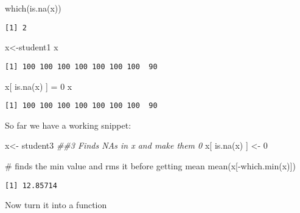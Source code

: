 \documentclass[
  letterpaper,
  DIV=11,
  numbers=noendperiod]{scrartcl}
\newenvironment{Shaded}{\begin{snugshade}}{\end{snugshade}}
\newcommand{\CommentTok}[1]{\textcolor[rgb]{0.37,0.37,0.37}{#1}}
\newcommand{\DecValTok}[1]{\textcolor[rgb]{0.68,0.00,0.00}{#1}}
\newcommand{\DocumentationTok}[1]{\textcolor[rgb]{0.37,0.37,0.37}{\textit{#1}}}
\newcommand{\FunctionTok}[1]{\textcolor[rgb]{0.28,0.35,0.67}{#1}}
\newcommand{\NormalTok}[1]{\textcolor[rgb]{0.00,0.23,0.31}{#1}}
\newcommand{\OtherTok}[1]{\textcolor[rgb]{0.00,0.23,0.31}{#1}}
\newcommand{\SpecialCharTok}[1]{\textcolor[rgb]{0.37,0.37,0.37}{#1}}
\begin{document}
\begin{Shaded}
\begin{Highlighting}[]
\FunctionTok{which}\NormalTok{(}\FunctionTok{is.na}\NormalTok{(x))}
\end{Highlighting}
\end{Shaded}

\begin{verbatim}
[1] 2
\end{verbatim}

\begin{Shaded}
\begin{Highlighting}[]
\NormalTok{x}\OtherTok{\textless{}{-}}\NormalTok{student1}
\NormalTok{x}
\end{Highlighting}
\end{Shaded}

\begin{verbatim}
[1] 100 100 100 100 100 100 100  90
\end{verbatim}

\begin{Shaded}
\begin{Highlighting}[]
\NormalTok{x[ }\FunctionTok{is.na}\NormalTok{(x) ] }\OtherTok{=} \DecValTok{0}
\NormalTok{x}
\end{Highlighting}
\end{Shaded}

\begin{verbatim}
[1] 100 100 100 100 100 100 100  90
\end{verbatim}

So far we have a working snippet:

\begin{Shaded}
\begin{Highlighting}[]
\NormalTok{x}\OtherTok{\textless{}{-}}\NormalTok{ student3}
\DocumentationTok{\#\#3 Finds NAs in \textquotesingle{}x\textquotesingle{} and make them 0}
\NormalTok{x[ }\FunctionTok{is.na}\NormalTok{(x) ] }\OtherTok{\textless{}{-}} \DecValTok{0}

\CommentTok{\# finds the min value and rm\textquotesingle{}s it before getting mean}
\FunctionTok{mean}\NormalTok{(x[}\SpecialCharTok{{-}}\FunctionTok{which.min}\NormalTok{(x)])}
\end{Highlighting}
\end{Shaded}

\begin{verbatim}
[1] 12.85714
\end{verbatim}

Now turn it into a function
\end{document}
